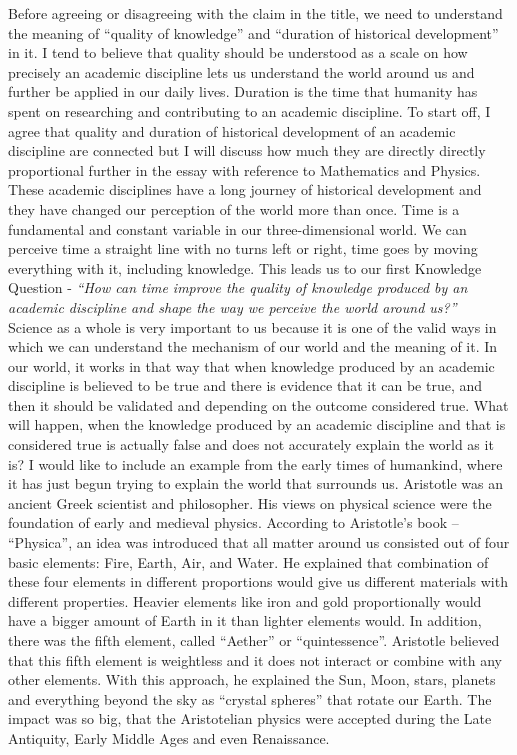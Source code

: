 \documentclass[12pt,a4paper]{article}
\begin{document}
Before agreeing or disagreeing with the claim in the title, we need to understand the meaning of ``quality of knowledge'' and
``duration of historical development'' in it. I tend to believe that quality should be understood as a scale on how precisely an academic discipline lets us understand the world around us and further be applied in our daily lives. Duration is the time that humanity has spent on researching and contributing to an academic discipline. To start off, I agree that quality and duration of historical development of an academic discipline are connected but I will discuss how much they are directly directly proportional further in the essay with reference to Mathematics and Physics. These academic disciplines have a long journey of historical development and they have changed our perception of the world more than once. Time is a fundamental and constant variable in our three-dimensional world\cite{time}.  We can perceive time a straight line with no turns left or right, time goes by moving everything with it, including knowledge. This leads us to our first Knowledge Question - \textit{“How can time improve the quality of knowledge produced by an academic discipline and shape the way we perceive the world around us?”}\\

Science as a whole is very important to us because it is one of the valid ways in which we can understand the mechanism of our world and the meaning of it. In our world, it works in that way that when knowledge produced by an academic discipline is believed to be true and there is evidence that it can be true, and then it should be validated and depending on the outcome considered true. What will happen, when the knowledge produced by an academic discipline and that is considered true is actually false and does not accurately explain the world as it is? I would like to include an example from the early times of humankind, where it has just begun trying to explain the world that surrounds us. Aristotle was an ancient Greek scientist and philosopher. His views on physical science were the foundation of early and medieval physics. According to Aristotle’s book – “Physica”, an idea was introduced that all matter around us consisted out of four basic elements: Fire, Earth, Air, and Water\cite{aether}. He explained that combination of these four elements in different proportions would give us different materials with different properties. Heavier elements like iron and gold proportionally would have a bigger amount of Earth in it than lighter elements would. In addition, there was the fifth element, called “Aether” or “quintessence”. Aristotle believed that this fifth element is weightless and it does not interact or combine with any other elements. With this approach, he explained the Sun, Moon, stars, planets and everything beyond the sky as “crystal spheres” that rotate our Earth. The impact was so big, that the Aristotelian physics were accepted during the Late Antiquity, Early Middle Ages and even Renaissance. \\
\end{document}
